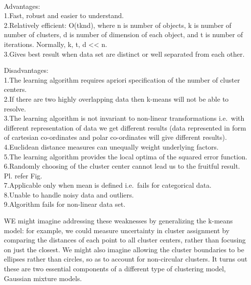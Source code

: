 \documentclass[11pt]{article}
\begin{document}
    \begin{center}
    \end{center}
    { \hspace*{\fill} \\}
    
    Advantages:\\
1.Fast, robust and easier to understand.\\
2.Relatively efficient: O(tknd), where n is number of objects, k is
number of number of clusters, d is number of dimension of each object,
and t is number of iterations. Normally, k, t, d \textless\textless{}
n.\\
3.Gives best result when data set are distinct or well separated from
each other.

    Disadvantages:\\
1.The learning algorithm requires apriori specification of the number of
cluster centers.\\
2.If there are two highly overlapping data then k-means will not be able
to resolve.\\
3.The learning algorithm is not invariant to non-linear transformations
i.e.~with different representation of data we get different results
(data represented in form of cartesian co-ordinates and polar
co-ordinates will give different results).\\
4.Euclidean distance measures can unequally weight underlying factors.\\
5.The learning algorithm provides the local optima of the squared error
function.\\
6.Randomly choosing of the cluster center cannot lead us to the fruitful
result. Pl. refer Fig.\\
7.Applicable only when mean is defined i.e.~fails for categorical
data.\\
8.Unable to handle noisy data and outliers.\\
9.Algorithm fails for non-linear data set.

    WE might imagine addressing these weaknesses by generalizing the k-means
model: for example, we could measure uncertainty in cluster assignment
by comparing the distances of each point to all cluster centers, rather
than focusing on just the closest. We might also imagine allowing the
cluster boundaries to be ellipses rather than circles, so as to account
for non-circular clusters. It turns out these are two essential
components of a different type of clustering model, Gaussian mixture
models.
\end{document}
